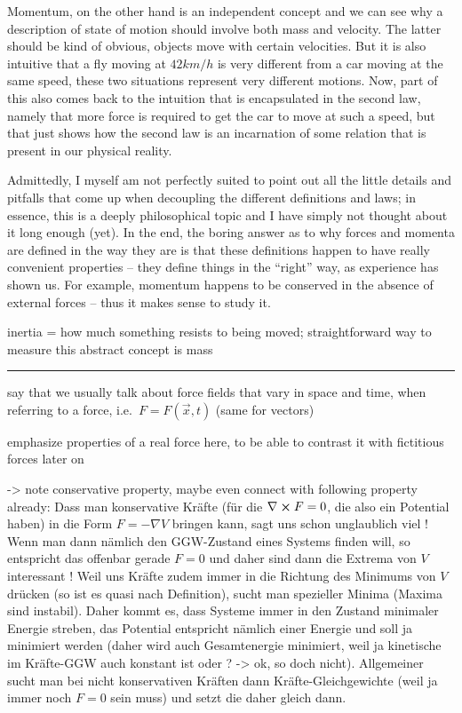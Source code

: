 \documentclass[../class_mech_main.tex]{subfiles}
\begin{document}
Momentum, on the other hand is an independent concept and we can see why a description of state of motion should involve both mass and velocity. The latter should be kind of obvious, objects move with certain velocities. But it is also intuitive that a fly moving at $42 km/h$ is very different from a car moving at the same speed, these two situations represent very different motions.
Now, part of this also comes back to the intuition that is encapsulated in the second law, namely that more force is required to get the car to move at such a speed, but that just shows how the second law is an incarnation of some relation that is present in our physical reality. 


Admittedly, I myself am not perfectly suited to point out all the little details and pitfalls that come up when decoupling the different definitions and laws; in essence, this is a deeply philosophical topic and I have simply not thought about it long enough (yet). In the end, the boring answer as to why forces and momenta are defined in the way they are is that these definitions happen to have really convenient properties -- they define things in the \enquote{right} way, as experience has shown us. For example, momentum happens to be conserved in the absence of external forces -- thus it makes sense to study it.


inertia = how much something resists to being moved; straightforward way to measure this abstract concept is mass


\hrule



say that we usually talk about force fields that vary in space and time, when referring to a force, i.e.~$F = F(\vec{x}, t)$ (same for vectors)

emphasize properties of a real force here, to be able to contrast it with fictitious forces later on


-> note conservative property, maybe even connect with following property already: Dass man konservative Kräfte (für die $\nabla \cross F = 0$, die also ein Potential haben) in die Form $F = - \nabla V$ bringen kann, sagt uns schon unglaublich viel ! Wenn man dann nämlich den GGW-Zustand eines Systems finden will, so entspricht das offenbar gerade $F = 0$ und daher sind dann die Extrema von $V$ interessant ! Weil uns Kräfte zudem immer in die Richtung des Minimums von $V$ drücken (so ist es quasi nach Definition), sucht man spezieller Minima (Maxima sind instabil). Daher kommt es, dass Systeme immer in den Zustand minimaler Energie streben, das Potential entspricht nämlich einer Energie und soll ja minimiert werden (daher wird auch Gesamtenergie minimiert, weil ja kinetische im Kräfte-GGW auch konstant ist oder ? -> ok, so doch nicht). Allgemeiner sucht man bei nicht konservativen Kräften dann Kräfte-Gleichgewichte (weil ja immer noch $F = 0$ sein muss) und setzt die daher gleich dann.
\end{document}

